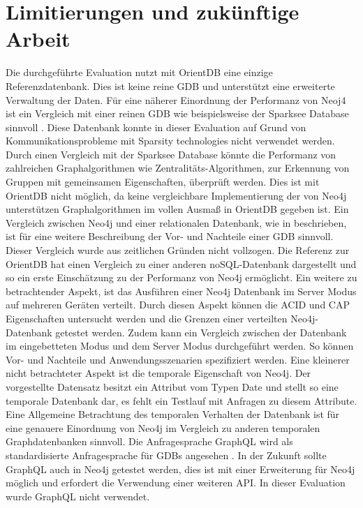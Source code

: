 \section{Limitierungen und zukünftige Arbeit}
Die durchgeführte Evaluation nutzt mit OrientDB  eine einzige Referenzdatenbank. Dies ist keine reine GDB und unterstützt eine erweiterte Verwaltung der Daten. Für eine näherer Einordnung der Performanz von Neoj4 ist ein Vergleich mit einer reinen GDB wie beispielsweise der Sparksee Database sinnvoll \parencite{Sparksee}. Diese Datenbank konnte in dieser Evaluation auf Grund von Kommunikationsprobleme mit Sparsity technologies nicht verwendet werden. Durch einen Vergleich mit der Sparksee Database könnte die Performanz von zahlreichen Graphalgorithmen  wie Zentralitäts-Algorithmen, zur Erkennung von Gruppen mit gemeinsamen Eigenschaften, überprüft werden. Dies ist mit OrientDB nicht möglich, da keine vergleichbare Implementierung der von Neo4j unterstützen Graphalgorithmen im vollen Ausmaß in OrientDB gegeben ist. \newline 
Ein Vergleich zwischen Neo4j und einer relationalen Datenbank, wie in \parencite{vicknair2010comparison} beschrieben, ist für eine weitere Beschreibung der Vor- und Nachteile einer GDB sinnvoll. Dieser Vergleich wurde aus zeitlichen Gründen nicht vollzogen. Die Referenz zur OrientDB hat einen Vergleich zu einer anderen noSQL-Datenbank dargestellt und so ein erste Einschätzung zu der Performanz von Neo4j ermöglicht. \newline
Ein weitere zu betrachtender Aspekt, ist das Ausführen einer Neo4j Datenbank im Server Modus auf mehreren Geräten verteilt. Durch diesen Aspekt können die ACID und CAP Eigenschaften untersucht werden und die Grenzen einer verteilten Neo4j-Datenbank getestet werden. Zudem kann ein Vergleich zwischen der Datenbank im eingebetteten Modus und dem Server Modus durchgeführt werden. So können Vor- und Nachteile und  Anwendungsszenarien spezifiziert werden. \newline
Eine kleinerer nicht betrachteter Aspekt ist die temporale Eigenschaft von Neo4j. Der vorgestellte Datensatz besitzt ein Attribut vom Typen Date und stellt so eine temporale Datenbank dar, es fehlt ein Testlauf mit Anfragen zu diesem Attribute. Eine Allgemeine Betrachtung des temporalen Verhalten der Datenbank ist für eine genauere Einordnung von Neo4j im Vergleich zu anderen temporalen Graphdatenbanken sinnvoll.   \newline
Die Anfragesprache GraphQL wird als standardisierte Anfragesprache für GDBs angesehen \parencite{GraphQL}. In der Zukunft sollte GraphQL auch in Neo4j getestet werden, dies ist mit einer Erweiterung für Neo4j möglich und erfordert die Verwendung einer weiteren API. In dieser Evaluation wurde GraphQL nicht verwendet. 
